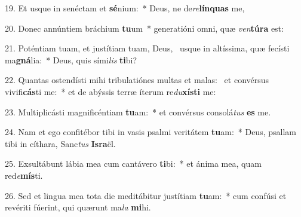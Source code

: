 19. Et usque in senéctam et \textbf{sé}nium:~*  Deus, ne de\textit{re}\textbf{lín}\textbf{quas} me,\

20. Donec annúntiem bráchium \textbf{tu}um~*  generatióni omni, quæ \textit{ven}\textbf{tú}\textbf{ra} est:\

21. Poténtiam tuam, et justítiam tuam, Deus, \dag\  usque in altíssima, quæ fecísti ma\textbf{gná}lia:~*  Deus, quis sími\textit{lis} \textbf{ti}bi?\

22. Quantas ostendísti mihi tribulatiónes multas et malas: \dag\  et convérsus vivifi\textbf{cás}ti me:~*  et de abýssis terræ íterum re\textit{du}\textbf{xís}\textbf{ti} me:\

23. Multiplicásti magnificéntiam \textbf{tu}am:~*  et convérsus consolá\textit{tus} \textbf{es} me.\

24. Nam et ego confitébor tibi in vasis psalmi veritátem \textbf{tu}am:~*  Deus, psallam tibi in cíthara, Sanc\textit{tus} \textbf{Is}\textbf{ra}ël.\

25. Exsultábunt lábia mea cum cantávero \textbf{ti}bi:~*  et ánima mea, quam red\textit{e}\textbf{mís}ti.\

26. Sed et lingua mea tota die meditábitur justítiam \textbf{tu}am:~*  cum confúsi et revériti fúerint, qui quærunt ma\textit{la} \textbf{mi}hi.\

